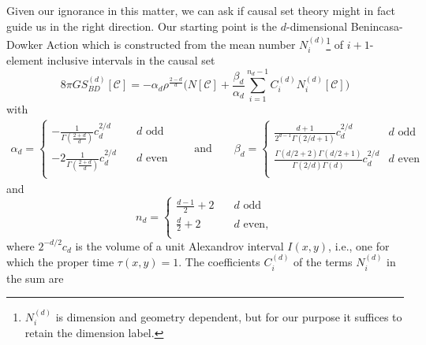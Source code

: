 \documentclass[12pt]{article}
\begin{document}
Given our ignorance in this matter,  we can ask if causal set theory  might  in fact guide us in the right direction.   Our starting point is the $d$-dimensional  Benincasa-Dowker Action \cite{Benincasa_Dowker:The_Scalar_Curvature_of_a_Causal_Set, Dowker_Glaser:dAlembertians_for_Causal_Sets} which is constructed from the mean number  $N_i^{(d)}${\footnote{ $N_i^{(d)}$ is dimension  and geometry dependent, but for our purpose it suffices to retain the dimension label. } of $i+1$-element inclusive intervals in the causal set 
\begin{equation}   
8 \pi G {S_{BD}^{(d)}}[\mathcal C] = -\alpha_d \rho^{\frac{2-d}{d}}\biggl( N[\mathcal C]+ \frac{\beta_d}{ \alpha_d} \sum_{i=1}^{n_d-1}  C^{(d)}_{i} N _i^{(d)}[\mathcal C] \biggr) 
\label{bd} 
\end{equation}  
with   
\begin{equation}
\begin{aligned}
 \alpha_d =   
\begin{cases}
-\frac{1}{\Gamma(\frac{2+d}{d})}c_d ^{2/d}  \quad   &d \, \, \mathrm{odd} \\
-2 \frac{1}{\Gamma(\frac{2+d}{d})}c_d ^{2/d}  \quad   &d \, \,  \mathrm{even} \\
\end{cases}
\qquad\text{and}\qquad \beta_d = 
\begin{cases} 
\frac{d+1}{2^{d-1}\Gamma(2/d +1)} c_d^{2/d}   \quad   &d\mathrm{ \, \, odd}\\ 
\frac{\Gamma(d/2+2)\Gamma(d/2+1)}{\Gamma(2/d)\Gamma(d)}c_d^{2/d}  &  d\mathrm{ \, \,  even}\\ 
\end{cases} 
\end{aligned}
\end{equation}
and
\begin{equation} 
n_d = 
\begin{cases} 
\frac{d-1}{2} + 2  \quad & d\mathrm{ \, \, odd}\\ 
\frac{d}{2} + 2  \quad &d\mathrm{ \, \,  even,}\\ 
\end{cases} 
\end{equation} 
where  $2^{-d/2} c_d$ is the volume of a unit Alexandrov interval $I(x,y)$, i.e., one for which the proper time $\tau(x,y)=1$. 
The coefficients $C_i^{(d)}$ of the terms $N_i^{(d)}$ in the sum are
}
\end{document}
